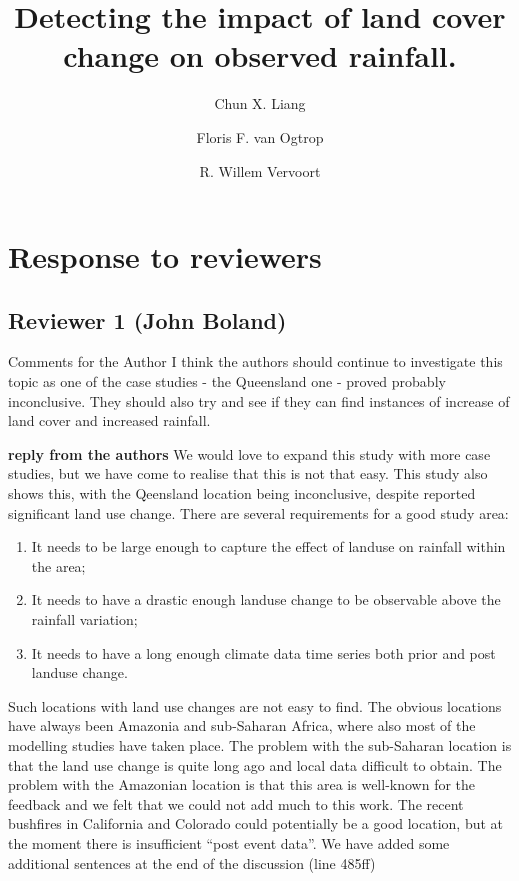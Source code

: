 \documentclass[fleqn,10pt,lineno]{wlpeerj} %
\title{Detecting the impact of land cover change on observed rainfall.}
\author[1]{Chun X. Liang}
\author[1]{Floris F. van Ogtrop}
\author[1]{R. Willem Vervoort}
\affil[1]{Sydney Institute of Agriculture, The University of Sydney, NSW 2006}
\providecommand{\tightlist}{
\setlength{\itemsep}{0pt}\setlength{\parskip}{0pt}}
\theoremstyle{definition}
\theoremstyle{definition}
\theoremstyle{definition}
\theoremstyle{remark}
\begin{document}
\flushbottom
\maketitle
\thispagestyle{empty}

\section{Response to reviewers}\label{response-to-reviewers}

\subsection{Reviewer 1 (John Boland)}\label{reviewer-1-john-boland}

Comments for the Author I think the authors should continue to
investigate this topic as one of the case studies - the Queensland one -
proved probably inconclusive. They should also try and see if they can
find instances of increase of land cover and increased rainfall.

\textbf{reply from the authors} We would love to expand this study with
more case studies, but we have come to realise that this is not that
easy. This study also shows this, with the Qeensland location being
inconclusive, despite reported significant land use change. There are
several requirements for a good study area:

\begin{enumerate}
\def\labelenumi{\arabic{enumi}.}
\tightlist
\item
  It needs to be large enough to capture the effect of landuse on
  rainfall within the area;\\
\item
  It needs to have a drastic enough landuse change to be observable
  above the rainfall variation;\\
\item
  It needs to have a long enough climate data time series both prior and
  post landuse change.
\end{enumerate}

Such locations with land use changes are not easy to find. The obvious
locations have always been Amazonia and sub-Saharan Africa, where also
most of the modelling studies have taken place. The problem with the
sub-Saharan location is that the land use change is quite long ago and
local data difficult to obtain. The problem with the Amazonian location
is that this area is well-known for the feedback and we felt that we
could not add much to this work. The recent bushfires in California and
Colorado could potentially be a good location, but at the moment there
is insufficient ``post event data''. We have added some additional
sentences at the end of the discussion (line 485ff)
\end{document}

